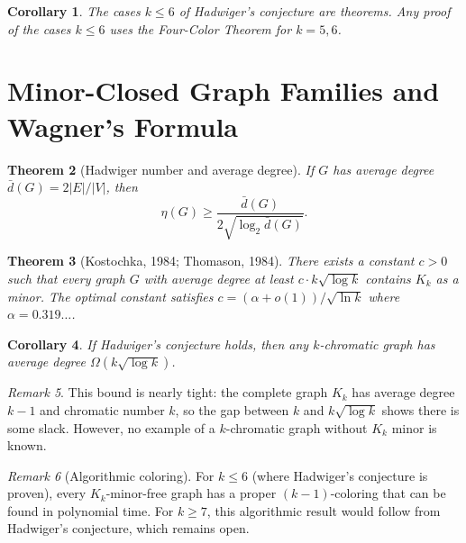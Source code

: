 \documentclass[12pt,a4paper]{amsart}
\newtheorem{theorem}{Theorem}[section]
\newtheorem{corollary}[theorem]{Corollary}
\theoremstyle{definition}
\theoremstyle{remark}
\newtheorem{remark}[theorem]{Remark}
\begin{document}
\begin{corollary}
The cases $k \leq 6$ of Hadwiger's conjecture are theorems. Any proof of
the cases $k \leq 6$ uses the Four-Color Theorem for $k = 5, 6$.
\end{corollary}

\section{Minor-Closed Graph Families and Wagner's Formula}

\begin{theorem}[Hadwiger number and average degree]\label{thm:avgdeg}
If $G$ has average degree $\bar{d}(G) = 2|E|/|V|$, then
\[
  \eta(G) \geq \frac{\bar{d}(G)}{2\sqrt{\log_2 \bar{d}(G)}}.
\]
\end{theorem}

\begin{theorem}[Kostochka, 1984; Thomason, 1984]\label{thm:kostochka}
There exists a constant $c > 0$ such that every graph $G$ with average degree
at least $c \cdot k \sqrt{\log k}$ contains $K_k$ as a minor. The optimal
constant satisfies $c = (\alpha + o(1)) / \sqrt{\ln k}$ where $\alpha = 0.319\ldots$.
\end{theorem}

\begin{corollary}
If Hadwiger's conjecture holds, then any $k$-chromatic graph has average degree
$\Omega(k \sqrt{\log k})$.
\end{corollary}

\begin{remark}
This bound is nearly tight: the complete graph $K_k$ has average degree $k-1$
and chromatic number $k$, so the gap between $k$ and $k \sqrt{\log k}$ shows
there is some slack. However, no example of a $k$-chromatic graph without
$K_k$ minor is known.
\end{remark}

\begin{remark}[Algorithmic coloring]
For $k \leq 6$ (where Hadwiger's conjecture is proven), every $K_k$-minor-free graph
has a proper $(k-1)$-coloring that can be found in polynomial time. For $k \geq 7$,
this algorithmic result would follow from Hadwiger's conjecture, which remains open.
\end{remark}

\end{document}
